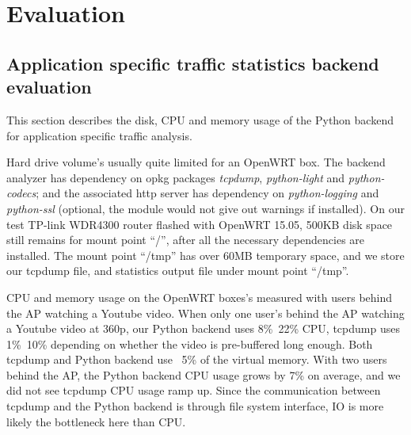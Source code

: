 \section{Evaluation}


\subsection{Application specific traffic statistics backend evaluation}

This section describes the disk, CPU and memory usage of the Python backend for application specific traffic analysis. 

Hard drive volume's usually quite limited for an OpenWRT box. The backend analyzer has dependency on opkg packages \textit{tcpdump}, \textit{python-light} and \textit{python-codecs}; and the associated http server has dependency on \textit{python-logging} and \textit{python-ssl} (optional, the module would not give out warnings if installed). On our test TP-link WDR4300 router flashed with OpenWRT 15.05, 500KB disk space still remains for mount point ``/'', after all the necessary dependencies are installed. The mount point ``/tmp'' has over 60MB temporary space, and we store our tcpdump file, and statistics output file under mount point ``/tmp''.

CPU and memory usage on the OpenWRT boxes's measured with users behind the AP watching a Youtube video. When only one user's behind the AP watching a Youtube video at 360p, our Python backend uses 8\%~22\% CPU, tcpdump uses 1\%~10\% depending on whether the video is pre-buffered long enough. Both tcpdump and Python backend use ~5\% of the virtual memory. With two users behind the AP, the Python backend CPU usage grows by 7\% on average, and we did not see tcpdump CPU usage ramp up. Since the communication between tcpdump and the Python backend is through file system interface, IO is more likely the bottleneck here than CPU.
